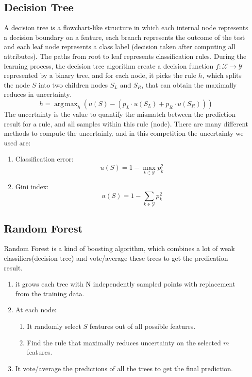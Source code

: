 \documentclass[conference]{IEEEtran}
\DeclareMathOperator*{\argmax}{arg\,max}
\begin{document}
\subsection{Decision Tree}
A decision tree is a flowchart-like structure in which each internal node represents a decision boundary on a feature, each branch represents the outcome of the test and each leaf node represents a class label (decision taken after computing all attributes). The paths from root to leaf represents classification rules. During the learning process, the decision tree algorithm create a decision function \(f: \mathcal{X}\rightarrow\mathcal{Y}\) represented by a binary tree, and for each node, it picks the rule $h$, which splits the node $S$ into two children nodes $S_L$ and $S_R$, that can obtain the maximally reduces in uncertainty.
\begin{equation}
h = \argmax_h (u(S)-(p_L \cdot u(S_L) + p_R \cdot u(S_R)))
\end{equation} 
The uncertainty is the value to quantify the mismatch between the prediction result for a rule, and all samples within this rule (node). There are many different methods to compute the uncertainly, and in this competition the uncertainty we used are:
\begin{enumerate}
\item Classification error:
\begin{equation}
u(S)=1-\max_{k \in \mathcal{Y}} p_k^2
\end{equation} 
\item Gini index:
\begin{equation}
u(S)=1-\sum_{k \in \mathcal{Y}} p_k^2
\end{equation} 
\end{enumerate}

\subsection{Random Forest}
Random Forest is a kind of boosting algorithm, which combines a lot of weak classifiers(decision tree) and vote/average these trees to get the predication result.
\begin{enumerate}
\item it grows each tree with N independently sampled points with replacement from the training data.
\item At each node:
\begin{enumerate}
\item It randomly select $S$ features out of all possible features.
\item Find the rule that maximally reduces uncertainty on the selected $m$ features.
\end{enumerate}
\item It vote/average the predictions of all the trees to get the final prediction.
\end{enumerate}
\end{document}

